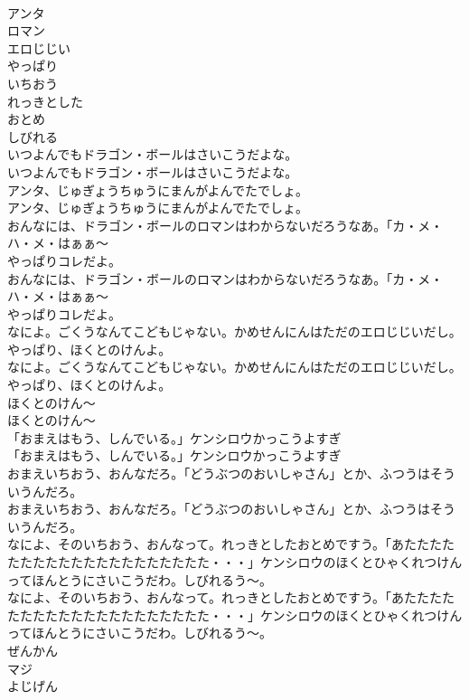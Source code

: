 \documentclass[8pt]{extreport}
\begin{document}
\begin{CJK}{UTF8}{min}
\\	アンタ
\\	ロマン
\\	エロじじい
\\	やっぱり
\\	いちおう
\\	れっきとした
\\	おとめ
\\	しびれる
\\	いつよんでもドラゴン・ボールはさいこうだよな。
\\	いつよんでもドラゴン・ボールはさいこうだよな。
\\	アンタ、じゅぎょうちゅうにまんがよんでたでしょ。
\\	アンタ、じゅぎょうちゅうにまんがよんでたでしょ。
\\	おんなには、ドラゴン・ボールのロマンはわからないだろうなあ。「カ・メ・ハ・メ・はぁぁ～
\\	やっぱりコレだよ。
\\	おんなには、ドラゴン・ボールのロマンはわからないだろうなあ。「カ・メ・ハ・メ・はぁぁ～
\\	やっぱりコレだよ。
\\	なによ。ごくうなんてこどもじゃない。かめせんにんはただのエロじじいだし。やっぱり、ほくとのけんよ。
\\	なによ。ごくうなんてこどもじゃない。かめせんにんはただのエロじじいだし。やっぱり、ほくとのけんよ。
\\	ほくとのけん～
\\	ほくとのけん～
\\	「おまえはもう、しんでいる。」ケンシロウかっこうよすぎ
\\	「おまえはもう、しんでいる。」ケンシロウかっこうよすぎ
\\	おまえいちおう、おんなだろ。「どうぶつのおいしゃさん」とか、ふつうはそういうんだろ。
\\	おまえいちおう、おんなだろ。「どうぶつのおいしゃさん」とか、ふつうはそういうんだろ。
\\	なによ、そのいちおう、おんなって。れっきとしたおとめですう。「あたたたたたたたたたたたたたたたたたたたた・・・」ケンシロウのほくとひゃくれつけんってほんとうにさいこうだわ。しびれるう～。
\\	なによ、そのいちおう、おんなって。れっきとしたおとめですう。「あたたたたたたたたたたたたたたたたたたたた・・・」ケンシロウのほくとひゃくれつけんってほんとうにさいこうだわ。しびれるう～。
\\	ぜんかん
\\	マジ
\\	よじげん

\end{CJK}
\end{document}
